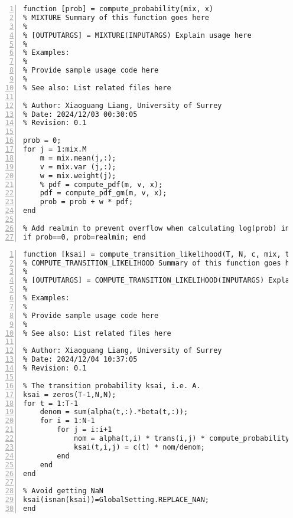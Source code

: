 \documentclass{article}
\begin{document}
\begin{lstlisting}[frame=single, numbers=left, style=Matlab-editor, caption={compute\_probability.m}, label={lst:compute_probability}]
  function [prob] = compute_probability(mix, x)
% MIXTURE Summary of this function goes here
%
% [OUTPUTARGS] = MIXTURE(INPUTARGS) Explain usage here
%
% Examples:
%
% Provide sample usage code here
%
% See also: List related files here

% Author: Xiaoguang Liang, University of Surrey
% Date: 2024/12/03 00:30:05
% Revision: 0.1

prob = 0;
for j = 1:mix.M
    m = mix.mean(j,:);
    v = mix.var (j,:);
    w = mix.weight(j);
    % pdf = compute_pdf(m, v, x);
    pdf = compute_pdf_gm(m, v, x);
    prob = prob + w * pdf;
end

% Add realmin to prevent overflow when calculating log(prob) in viterbi.m.
if prob==0, prob=realmin; end

\end{lstlisting}

\begin{lstlisting}[frame=single, numbers=left, style=Matlab-editor, caption={compute\_transition\_likelihood.m}, label={lst:compute_transition_likelihood}]
  function [ksai] = compute_transition_likelihood(T, N, c, mix, trans, observations, alpha, beta)
% COMPUTE_TRANSITION_LIKELIHOOD Summary of this function goes here
% 
% [OUTPUTARGS] = COMPUTE_TRANSITION_LIKELIHOOD(INPUTARGS) Explain usage here
% 
% Examples: 
% 
% Provide sample usage code here
% 
% See also: List related files here

% Author: Xiaoguang Liang, University of Surrey 
% Date: 2024/12/04 10:37:05 
% Revision: 0.1 

% The transition probability ksai, i.e. A.
ksai = zeros(T-1,N,N);
for t = 1:T-1
    denom = sum(alpha(t,:).*beta(t,:));
    for i = 1:N-1
    	for j = i:i+1
    		nom = alpha(t,i) * trans(i,j) * compute_probability(mix(j),observations(t+1,:)) * beta(t+1,j);
    		ksai(t,i,j) = c(t) * nom/denom;
    	end
    end
end

% Avoid getting NaN
ksai(isnan(ksai))=GlobalSetting.REPLACE_NAN;
end

\end{lstlisting}
\end{document}
